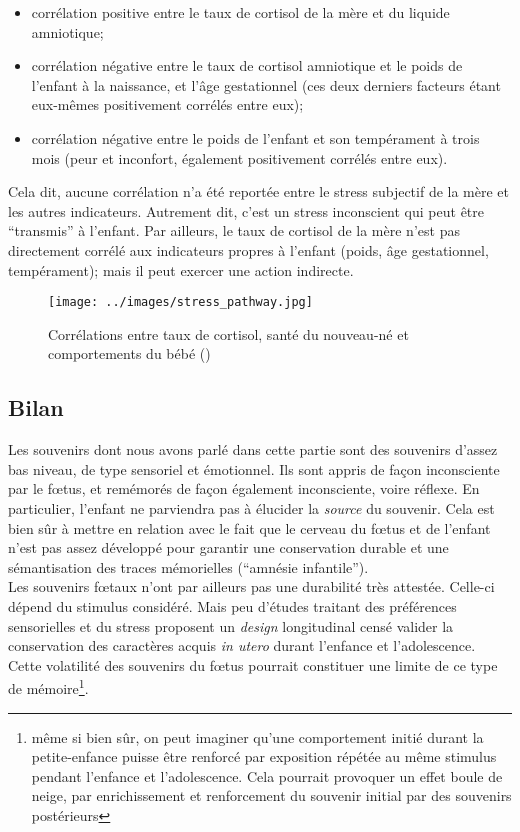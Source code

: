 \documentclass[french]{article}
\begin{document}
				\begin{itemize}
					\item corrélation positive entre le taux de cortisol de la mère et du liquide amniotique;
					\item corrélation négative entre le taux de cortisol amniotique et le poids de l'enfant à la naissance, et l'âge gestationnel (ces deux derniers facteurs étant eux-mêmes positivement corrélés entre eux);
					\item corrélation négative entre le poids de l'enfant et son tempérament à trois mois (peur et inconfort, également positivement corrélés entre eux).
				\end{itemize}\vspace{3mm}
				Cela dit, aucune corrélation n'a été reportée entre le stress subjectif de la mère et les autres indicateurs. Autrement dit, c'est un stress inconscient qui peut être ``transmis'' à l'enfant. Par ailleurs, le taux de cortisol de la mère n'est pas directement corrélé aux indicateurs propres à l'enfant (poids, âge gestationnel, tempérament); mais il peut exercer une action indirecte.
				\begin{figure}[H]
					\centering
					\texttt{[image: ../images/stress\_pathway.jpg]}
					\caption{Corrélations entre taux de cortisol, santé du nouveau-né et comportements du bébé (\cite{baibazarova2013})}
				\end{figure}
			
			\subsection{Bilan}
				Les souvenirs dont nous avons parlé dans cette partie sont des souvenirs d'assez bas niveau, de type sensoriel et émotionnel. Ils sont appris de façon inconsciente par le fœtus, et remémorés de façon également inconsciente, voire réflexe. En particulier, l'enfant ne parviendra pas à élucider la \textit{source} du souvenir. Cela est bien sûr à mettre en relation avec le fait que le cerveau du fœtus et de l'enfant n'est pas assez développé pour garantir une conservation durable et une sémantisation des traces mémorielles (``amnésie infantile'').\\
				Les souvenirs fœtaux n'ont par ailleurs pas une durabilité très attestée. Celle-ci dépend du stimulus considéré. Mais peu d'études traitant des préférences sensorielles et du stress proposent un \textit{design} longitudinal censé valider la conservation des caractères acquis \textit{in utero} durant l'enfance et l'adolescence. Cette volatilité des souvenirs du fœtus pourrait constituer une limite de ce type de mémoire\footnote{ même si bien sûr, on peut imaginer qu'une comportement initié durant la petite-enfance puisse être renforcé par exposition répétée au même stimulus pendant l'enfance et l'adolescence. Cela pourrait provoquer un effet boule de neige, par enrichissement et renforcement du souvenir initial par des souvenirs postérieurs}.
				
\end{document}
